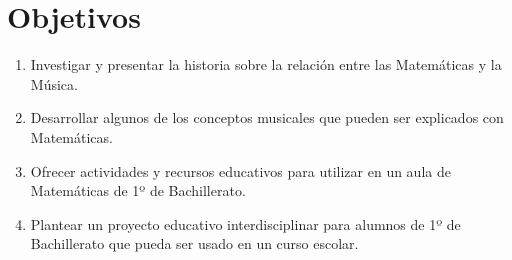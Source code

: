 \documentclass[a4paper, openright, 11pt, titlepage]{report}
\theoremstyle{definition}\newtheorem{defin}[propo]{Definition}
\theoremstyle{definition}\newtheorem{obser}[propo]{Remark}
\theoremstyle{definition}\newtheorem{ejem}[propo]{Ejemplo}
\theoremstyle{definition}\newtheorem{algoritmo}[propo]{Algoritmo}
\begin{document}
\section{Objetivos}
\begin{enumerate}
    \item Investigar y presentar la historia sobre la relación entre las Matemáticas y la Música.
    \item Desarrollar algunos de los conceptos musicales que pueden ser explicados con Matemáticas. 
    \item Ofrecer actividades y recursos educativos para utilizar en un aula de Matemáticas de 1º de Bachillerato.
    \item Plantear un proyecto educativo interdisciplinar para alumnos de 1º de Bachillerato que pueda ser usado en un curso escolar.
\end{enumerate}
\newpage
\end{document}
